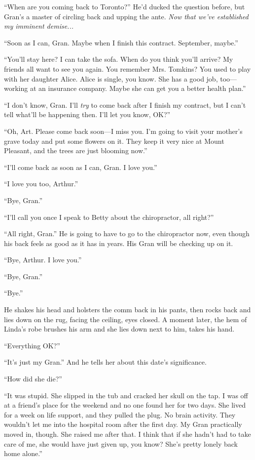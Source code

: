 “When are you coming back to Toronto?” He’d ducked the question
before, but Gran’s a master of circling back and upping the ante.
\emph{Now that we’ve established my imminent demise...}

“Soon as I can, Gran. Maybe when I finish this contract. September,
maybe.”

“You’ll stay here? I can take the sofa. When do you think you’ll
arrive? My friends all want to see you again. You remember Mrs.
Tomkins? You used to play with her daughter Alice. Alice is single,
you know. She has a good job, too—working at an insurance company.
Maybe she can get you a better health plan.”

“I don’t know, Gran. I’ll \emph{try} to come back after I finish my
contract, but I can’t tell what’ll be happening then. I’ll let you
know, OK?”

“Oh, Art. Please come back soon—I miss you. I’m going to visit your
mother’s grave today and put some flowers on it. They keep it very
nice at Mount Pleasant, and the trees are just blooming now.”

“I’ll come back as soon as I can, Gran. I love you.”

“I love you too, Arthur.”

“Bye, Gran.”

“I’ll call you once I speak to Betty about the chiropractor, all
right?”

“All right, Gran.” He is going to have to go to the chiropractor
now, even though his back feels as good as it has in years. His
Gran will be checking up on it.

“Bye, Arthur. I love you.”

“Bye, Gran.”

“Bye.”

He shakes his head and holsters the comm back in his pants, then
rocks back and lies down on the rug, facing the ceiling, eyes
closed. A moment later, the hem of Linda’s robe brushes his arm and
she lies down next to him, takes his hand.

“Everything OK?”

“It’s just my Gran.” And he tells her about this date’s
significance.

“How did she die?”

“It was stupid. She slipped in the tub and cracked her skull on the
tap. I was off at a friend’s place for the weekend and no one found
her for two days. She lived for a week on life support, and they
pulled the plug. No brain activity. They wouldn’t let me into the
hospital room after the first day. My Gran practically moved in,
though. She raised me after that. I think that if she hadn’t had to
take care of me, she would have just given up, you know? She’s
pretty lonely back home alone.”

